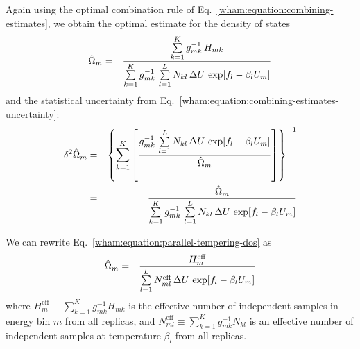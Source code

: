 Again using the optimal combination rule of Eq.\ \ref{wham:equation:combining-estimates}, we obtain the optimal estimate for the density of states
\begin{eqnarray} 
\hat{\Omega}_m &=& \frac{\sum\limits_{k=1}^K g_{mk}^{-1} \, H_{mk}}{\sum\limits_{k=1}^K g_{mk}^{-1} \, \sum\limits_{l=1}^L N_{kl} \, \Delta U \, \exp[f_{l} - \beta_{l} U_m]} \label{wham:equation:parallel-tempering-dos}
\end{eqnarray}
and the statistical uncertainty from Eq.\ \ref{wham:equation:combining-estimates-uncertainty}:
\begin{eqnarray} 
\delta^2 \hat{\Omega}_m &=& \left\{ \sum_{k = 1}^K \left[ \frac{g_{mk}^{-1} \, \sum\limits_{l=1}^L N_{kl} \, \Delta U \, \exp[f_l - \beta_l U_m]}{\hat{\Omega}_m} \right] \right\}^{-1} \nonumber \\
&=& \frac{\hat{\Omega}_m}{\sum\limits_{k = 1}^K g_{mk}^{-1} \, \sum\limits_{l=1}^L N_{kl} \, \Delta U \, \exp[f_l - \beta_l U_m]} \label{wham:equation:parallel-tempering-dos-uncertainty}
\end{eqnarray}

We can rewrite Eq.\ \ref{wham:equation:parallel-tempering-dos} as
\begin{eqnarray}
\hat{\Omega}_m &=& \frac{H^\mathrm{eff}_m}{\sum\limits_{l=1}^L N^\mathrm{eff}_{ml} \, \Delta U \, \exp[f_{l} - \beta_{l} U_m]} \label{wham:equation:parallel-tempering-dos-neff}
\end{eqnarray}
where $H^\mathrm{eff}_m \equiv \sum_{k=1}^K g_{mk}^{-1} H_{mk}$ is the effective number of independent samples in energy bin $m$ from all replicas, and $N^\mathrm{eff}_{ml} \equiv \sum_{k=1}^K g_{mk}^{-1} N_{kl}$ is an effective number of independent samples at temperature $\beta_l$ from all replicas.

